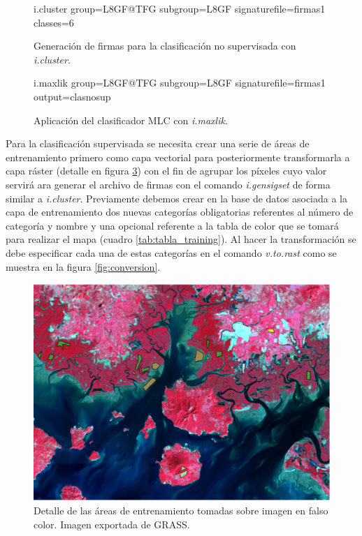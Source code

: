 \begin{figure}[ht]
	\centering
	\begin{boxedverbatim}
	i.cluster group=L8GF@TFG subgroup=L8GF
	signaturefile=firmas1 classes=6
	\end{boxedverbatim}
	\caption[Generación de firmas \textit{i.cluster}]{Generación de firmas para la clasificación no supervisada con \textit{i.cluster}.}
	\label{fig:cluster}
\end{figure}

\begin{figure}[ht]
	\centering
	\begin{boxedverbatim}
	i.maxlik group=L8GF@TFG subgroup=L8GF
	signaturefile=firmas1 output=clasnosup
	\end{boxedverbatim}
	\caption[Clasificación con \textit{i.maxlik}]{Aplicación del clasificador \ac{MLC} con \textit{i.maxlik}.}
	\label{fig:maxlik}
\end{figure}

Para la clasificación supervisada se necesita crear una serie de áreas de entrenamiento primero como capa vectorial para posteriormente transformarla a capa ráster (detalle en figura \ref{fig:detalle_training}) con el fin de agrupar los píxeles cuyo valor servirá ara generar el archivo de firmas con el comando \textit{i.gensigset} de forma similar a \textit{i.cluster}. Previamente debemos crear en la base de datos asociada a la capa de entrenamiento dos nuevas categorías obligatorias referentes al número de categoría y nombre y una opcional referente a la tabla de color que se tomará para realizar el mapa (cuadro \ref{tab:tabla_training}). Al hacer la transformación se debe especificar cada una de estas categorías en el comando \textit{v.to.rast} como se muestra en la figura \ref{fig:conversion}.\Sep

\begin{figure}
	\centering
	\includegraphics[width=0.9\linewidth]{./Imagenes/Detalle_training.eps}
	\caption[Detalle de áreas de entrenamiento]{Detalle de las áreas de entrenamiento tomadas sobre imagen en falso color. Imagen exportada de GRASS.}
	\label{fig:detalle_training}
\end{figure}

